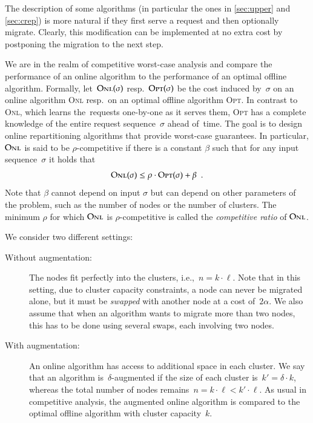 \documentclass[11pt,a4paper]{scrartcl}
\newcommand{\ONL}{\textsc{Onl}\xspace}
\newcommand{\OPT}{\textsc{Opt}\xspace}
\begin{document}
The description of some algorithms (in particular the ones in \cref{sec:upper}
and \cref{sec:crep}) is more natural if they first serve a request and then
optionally migrate. Clearly, this modification can be implemented at no extra cost by
postponing the migration to the next step.

We are in the realm of competitive worst-case analysis and compare the
performance of an online algorithm to the performance of an optimal offline
algorithm. Formally, let~$\ONL(\sigma)$ resp.~$\OPT(\sigma)$ be the cost
induced by~$\sigma$ on an online algorithm \ONL resp.~on an optimal offline
algorithm \OPT. In contrast to \ONL, which learns the~requests one-by-one as
it serves them, \OPT has a complete knowledge of the entire request
sequence~$\sigma$ ahead of~time. The goal is to design online repartitioning
algorithms that provide worst-case guarantees. In particular, $\ONL$ is said
to be $\rho$-competitive if there is a constant $\beta$ such that for any
input sequence~$\sigma$ it holds that
\[
	\ONL(\sigma) \leq \rho \cdot \OPT(\sigma) + \beta 
	\enspace.
\]
Note that $\beta$ cannot depend on input $\sigma$ but can depend on other
parameters of the problem, such as the number of nodes or the number of clusters.
The minimum $\rho$ for which $\ONL$ is $\rho$-competitive is called the 
\emph{competitive ratio} of $\ONL$. 

We consider two different settings:

\begin{description}

\item[Without augmentation:] The nodes fit perfectly into the clusters,
i.e.,~$n=k\cdot \ell$. Note that in this setting, due to cluster capacity
constraints, a node can never be migrated alone, but it must be \emph{swapped}
with another node at a cost of~$2\alpha$. We also assume that when an
algorithm wants to migrate more than two nodes, this has to be done using
several swaps, each involving two nodes.

\item[With augmentation:] An online algorithm has access to additional space
in each cluster. We say that an algorithm is~$\delta$-augmented if the size of
each cluster is~$k' = \delta \cdot k$, whereas the total number of nodes
remains~$n = k\cdot \ell < k'\cdot \ell$. As usual in competitive analysis,
the augmented online algorithm is compared to the optimal offline algorithm
with cluster capacity~$k$.
\end{description}
\end{document}
